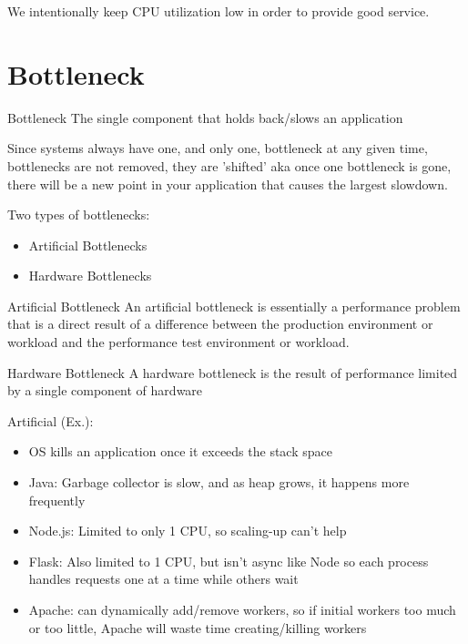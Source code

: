 \documentclass[fancy,11pt,titlestyle=display]{style/elegantbook}
\begin{document}
We intentionally keep CPU utilization low in order to provide good service.\\


\section{Bottleneck}

\begin{definition}{Bottleneck}
The single component that holds back/slows an application
\end{definition}

Since systems always have one, and only one, bottleneck at any given time, bottlenecks are not removed, they are 'shifted' aka once one bottleneck is gone, there will be a new point in your application that causes the largest slowdown.

\noindent Two types of bottlenecks:
\begin{itemize}
\item Artificial Bottlenecks
\item Hardware Bottlenecks
\end{itemize}

\begin{definition}{Artificial Bottleneck}
An artificial bottleneck is essentially a performance problem that is a direct result of a difference between the production environment or workload and the performance test environment or workload.
\end{definition}
\begin{definition}{Hardware Bottleneck}
A hardware bottleneck is the result of performance limited by a single component of hardware
\end{definition}

\noindent Artificial (Ex.):
\begin{itemize}
    \item OS kills an application once it exceeds the stack space
    \item Java: Garbage collector is slow, and as heap grows, it happens more frequently
    \item Node.js: Limited to only 1 CPU, so scaling-up can't help
    \item Flask: Also limited to 1 CPU, but isn't async like Node so each process handles requests one at a time while others wait
    \item Apache: can dynamically add/remove workers, so if initial workers too much or too little, Apache will waste time creating/killing workers
\end{itemize}
\end{document}
